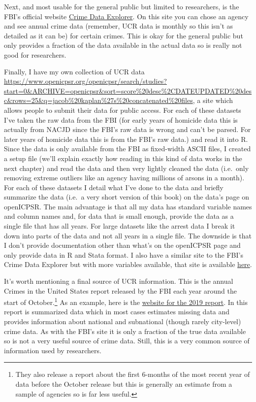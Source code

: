 \documentclass[
  12pt,
  openany]{book}
\begin{document}
Next, and most usable for the general public but limited to researchers, is the FBI's official website \href{https://crime-data-explorer.fr.cloud.gov/}{Crime Data Explorer}. On this site you can chose an agency and see annual crime data (remember, UCR data is monthly so this isn't as detailed as it can be) for certain crimes. This is okay for the general public but only provides a fraction of the data available in the actual data so is really not good for researchers.

Finally, I have my own collection of UCR data \href{available\%20publicly\%20on\%20openICPSR}{https://www.openicpsr.org/openicpsr/search/studies?start=0\&ARCHIVE=openicpsr\&sort=score\%20desc\%2CDATEUPDATED\%20desc\&rows=25\&q=jacob\%20kaplan\%27s\%20concatenated\%20files}, a site which allows people to submit their data for public access. For each of these datasets I've taken the raw data from the FBI (for early years of homicide data this is actually from NACJD since the FBI's raw data is wrong and can't be parsed. For later years of homicide data this is from the FBI's raw data.) and read it into R. Since the data is only available from the FBI as fixed-width ASCII files, I created a setup file (we'll explain exactly how reading in this kind of data works in the next chapter) and read the data and then very lightly cleaned the data (i.e.~only removing extreme outliers like an agency having millions of arsons in a month). For each of these datasets I detail what I've done to the data and briefly summarize the data (i.e.~a very short version of this book) on the data's page on openICPSR. The main advantage is that all my data has standard variable names and column names and, for data that is small enough, provide the data as a single file that has all years. For large datasets like the arrest data I break it down into parts of the data and not all years in a single file. The downside is that I don't provide documentation other than what's on the openICPSR page and only provide data in R and Stata format. I also have a similar site to the FBI's Crime Data Explorer but with more variables available, that site is available \href{jacobdkaplan.com/}{here}.

It's worth mentioning a final source of UCR information. This is the annual Crimes in the United States report released by the FBI each year around the start of October.\footnote{They also release a report about the first 6-months of the most recent year of data before the October release but this is generally an estimate from a sample of agencies so is far less useful.} As an example, here is the \href{https://ucr.fbi.gov/crime-in-the-u.s/2019/crime-in-the-u.s.-2019}{website for the 2019 report}. In this report is summarized data which in most cases estimates missing data and provides information about national and subnational (though rarely city-level) crime data. As with the FBI's site it is only a fraction of the true data available so is not a very useful source of crime data. Still, this is a very common source of information used by researchers.
\end{document}

